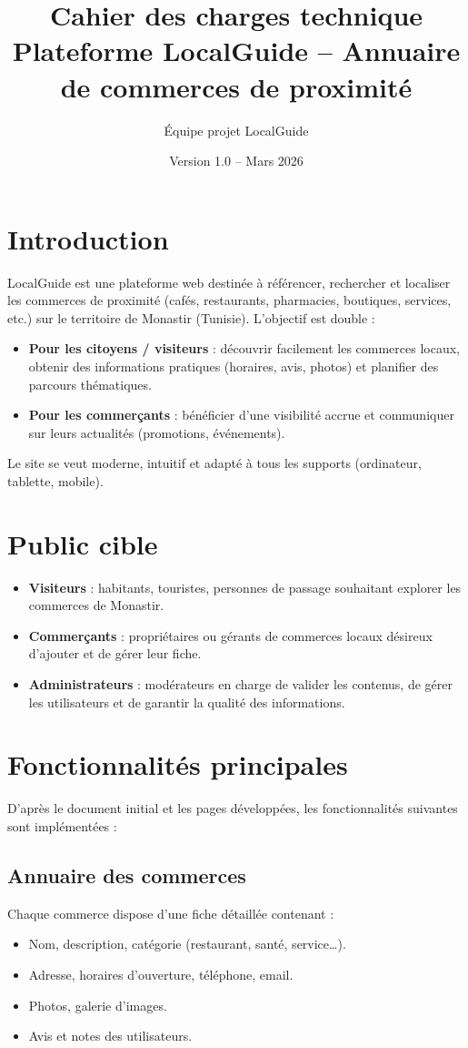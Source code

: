 \documentclass[a4paper,12pt]{article}
\title{\textbf{Cahier des charges technique} \\
       \Large Plateforme LocalGuide – Annuaire de commerces de proximité}
\author{Équipe projet LocalGuide}
\date{Version 1.0 – Mars 2026}
\begin{document}
\maketitle
\tableofcontents
\newpage

\section{Introduction}
LocalGuide est une plateforme web destinée à référencer, rechercher et localiser les commerces de proximité (cafés, restaurants, pharmacies, boutiques, services, etc.) sur le territoire de Monastir (Tunisie).  
L’objectif est double :
\begin{itemize}
    \item \textbf{Pour les citoyens / visiteurs} : découvrir facilement les commerces locaux, obtenir des informations pratiques (horaires, avis, photos) et planifier des parcours thématiques.
    \item \textbf{Pour les commerçants} : bénéficier d’une visibilité accrue et communiquer sur leurs actualités (promotions, événements).
\end{itemize}
Le site se veut moderne, intuitif et adapté à tous les supports (ordinateur, tablette, mobile).

\section{Public cible}
\begin{itemize}
    \item \textbf{Visiteurs} : habitants, touristes, personnes de passage souhaitant explorer les commerces de Monastir.
    \item \textbf{Commerçants} : propriétaires ou gérants de commerces locaux désireux d’ajouter et de gérer leur fiche.
    \item \textbf{Administrateurs} : modérateurs en charge de valider les contenus, de gérer les utilisateurs et de garantir la qualité des informations.
\end{itemize}

\section{Fonctionnalités principales}
D’après le document initial et les pages développées, les fonctionnalités suivantes sont implémentées :

\subsection{Annuaire des commerces}
Chaque commerce dispose d’une fiche détaillée contenant :
\begin{itemize}
    \item Nom, description, catégorie (restaurant, santé, service…).
    \item Adresse, horaires d’ouverture, téléphone, email.
    \item Photos, galerie d’images.
    \item Avis et notes des utilisateurs.
\end{itemize}
\end{document}
